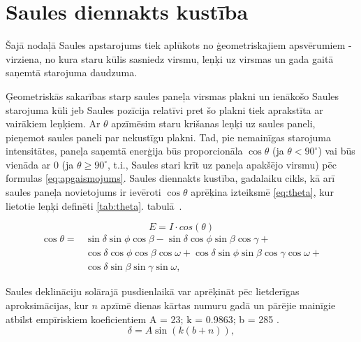 
\section{Saules diennakts kustība}\label{section:kustiba}

Šajā nodaļā Saules apstarojums tiek aplūkots no ģeometriskajiem apsvērumiem - virziena, no kura staru kūlis sasniedz virsmu, leņķi uz virsmas un gada gaitā saņemtā starojuma daudzuma.

Ģeometriskās sakarības starp saules paneļa virsmas plakni un ienākošo Saules starojuma kūli jeb Saules pozīcija relatīvi pret šo plakni tiek aprakstīta ar vairākiem leņķiem. Ar $\theta$ apzīmēsim staru krišanas leņķi uz saules paneli, pieņemot saules paneli par nekustīgu plakni. Tad, pie nemainīgas starojuma intensitātes, paneļa saņemtā enerģija būs proporcionāla $\cos{\theta}$ (ja $\theta<90^\circ$) vai būs vienāda ar 0 (ja $\theta \geq 90^\circ$, t.i., Saules stari krīt uz paneļa apakšējo virsmu) pēc formulas \ref{eq:apgaismojums}. Saules diennakts kustība, gadalaiku cikls, kā arī saules paneļa novietojums ir ievēroti $\cos{\theta}$ aprēķina izteiksmē \ref{eq:theta}, kur lietotie leņķi definēti \ref{tab:theta}. tabulā~\cite{ThermalProcesses}.

\begin{equation}
\label{eq:apgaismojums}
E = I \cdot cos(\theta)
\end{equation}
\begin{equation}
\label{eq:theta}
\begin{aligned}
\cos{\theta} = {} & \sin{\delta} \sin{\phi} \cos{\beta} - \sin{\delta} \cos{\phi} \sin{\beta} \cos{\gamma} +                           \\
	& \cos{\delta} \cos{\phi} \cos{\beta} \cos{\omega} + \cos{\delta} \sin{\phi} \sin{\beta} \cos{\gamma} \cos{\omega} + \\
	& \cos{\delta} \sin{\beta} \sin{\gamma} \sin{\omega},
\end{aligned}
\end{equation}

Saules deklināciju solārajā pusdienlaikā var aprēķināt pēc lietderīgas aproksimācijas, kur $n$ apzīmē dienas kārtas numuru gadā un pārējie mainīgie atbilst empīriskiem koeficientiem A = 23; k = 0.9863; b = 285 \cite{cooper1969}.
\begin{equation}
\label{eq:delta}
    \delta = A \sin \left( k (b + n) \right),
\end{equation}

